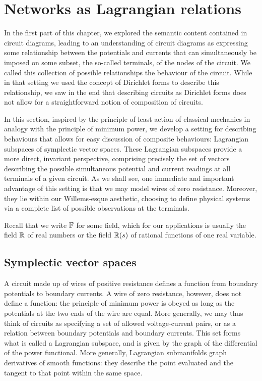 \section{Networks as Lagrangian relations} \label{sec:circlagr}
In the first part of this chapter, we explored the semantic content contained in
circuit diagrams, leading to an understanding of circuit diagrams as expressing
some relationship between the potentials and currents that can simultaneously be
imposed on some subset, the so-called terminals, of the nodes of the circuit. We
called this collection of possible relationships the behaviour of the circuit.
While in that setting we used the concept of Dirichlet forms to describe this
relationship, we saw in the end that describing circuits as Dirichlet forms does
not allow for a straightforward notion of composition of circuits. 

In this section, inspired by the principle of least action of classical
mechanics in analogy with the principle of minimum power, we develop a setting
for describing behaviours that allows for easy discussion of composite
behaviours: Lagrangian subspaces of symplectic vector spaces. These Lagrangian
subspaces provide a more direct, invariant perspective, comprising precisely the
set of vectors describing the possible simultaneous potential and current
readings at all terminals of a given circuit. As we shall see, one immediate and
important advantage of this setting is that we may model wires of zero
resistance. Moreover, they lie within our Willems-esque aesthetic, choosing to
define physical systems via a complete list of possible observations at the
terminals.

Recall that we write ${\mathbb F}$ for some field, which for our applications is
usually the field ${\mathbb{R}}$ of real numbers or the field ${\mathbb{R}}(s)$ of rational
functions of one real variable.

\subsection{Symplectic vector spaces}

A circuit made up of wires of positive resistance defines a function from
boundary potentials to boundary currents. A wire of zero resistance, however,
does not define a function: the principle of minimum power is obeyed as long as
the potentials at the two ends of the wire are equal. More generally, we may
thus think of circuits as specifying a set of allowed voltage-current pairs, or
as a relation between boundary potentials and boundary currents. This set forms
what is called a Lagrangian subspace, and is given by the graph of the
differential of the power functional. More generally, Lagrangian submanifolds
graph derivatives of smooth functions: they describe the point evaluated and the
tangent to that point within the same space.

